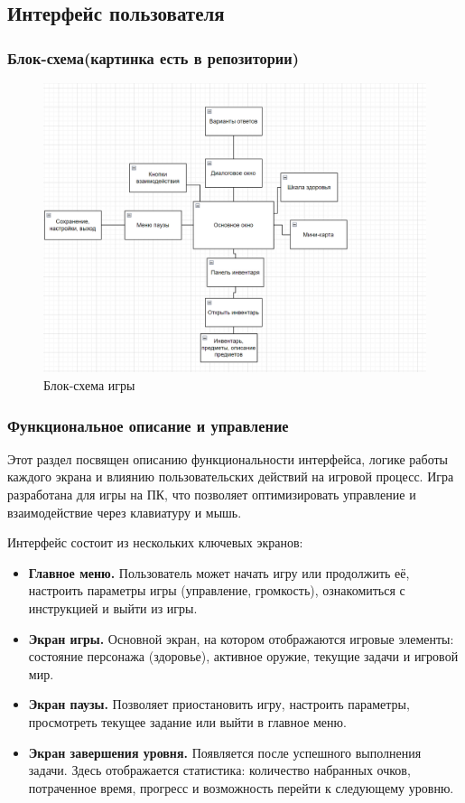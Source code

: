 \documentclass[12pt]{article}
\begin{document}
    \subsection{Интерфейс пользователя}
        \subsubsection{Блок-схема(картинка есть в репозитории)}
\begin{figure}
    \centering
    \includegraphics[width=0.5\linewidth]{image.png}
    \caption{Блок-схема игры}
    \label{fig:enter-label}
\end{figure}
        \subsubsection{Функциональное описание и управление}
        Этот раздел посвящен описанию функциональности интерфейса, логике работы каждого экрана и влиянию пользовательских действий на игровой процесс. Игра разработана для игры на ПК, что позволяет оптимизировать управление и взаимодействие через клавиатуру и мышь.  
        
        Интерфейс состоит из нескольких ключевых экранов:  
        \begin{itemize}
            \item \textbf{Главное меню.} Пользователь может начать игру или продолжить её, настроить параметры игры (управление, громкость), ознакомиться с инструкцией и выйти из игры.  
            \item \textbf{Экран игры.} Основной экран, на котором отображаются игровые элементы: состояние персонажа (здоровье), активное оружие, текущие задачи и игровой мир.  
            \item \textbf{Экран паузы.} Позволяет приостановить игру, настроить параметры, просмотреть текущее задание или выйти в главное меню.  
            \item \textbf{Экран завершения уровня.} Появляется после успешного выполнения задачи. Здесь отображается статистика: количество набранных очков, потраченное время, прогресс и возможность перейти к следующему уровню.  
        \end{itemize}
        
\end{document}
